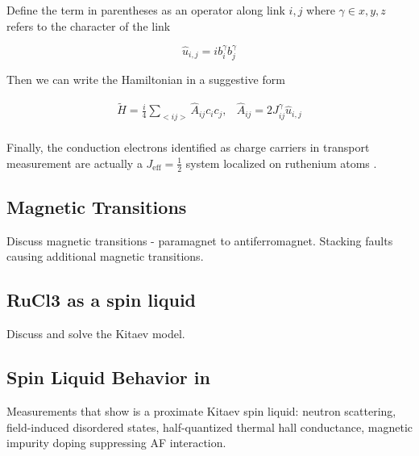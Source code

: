 Define the term in parentheses as an operator along link $i,j$ where $\gamma \in x,y,z$ refers to the character of the link

\begin{equation}
\hat{u}_{i,j} = i b_{i}^{\gamma} b_{j}^{\gamma}
\end{equation}

Then we can write the Hamiltonian in a suggestive form

\begin{equation}
\begin{array}{cc}
	\tilde{H} = \frac{i}{4} \sum_{<ij>} \hat{A}_{ij} c_{i} c_{j}, & \hat{A}_{ij} = 2 J^{\gamma}_{ij}\hat{u}_{i,j} \\
\end{array}
\end{equation}

Finally, the conduction electrons identified as charge carriers in transport measurement are actually a $J_{\text{eff}} = \frac{1}{2}$ system localized on ruthenium atoms \cite{Plumb2014}.

\subsection{Magnetic Transitions}

Discuss magnetic transitions - paramagnet to antiferromagnet. Stacking faults causing additional magnetic transitions.




\subsection{RuCl3 as a spin liquid}

Discuss and solve the Kitaev model.

\subsection{Spin Liquid Behavior in \texorpdfstring{\rucl}{RuCl3}}

Measurements that show \rucl is a proximate Kitaev spin liquid: neutron scattering, field-induced disordered states, half-quantized thermal hall conductance, magnetic impurity doping suppressing AF interaction.